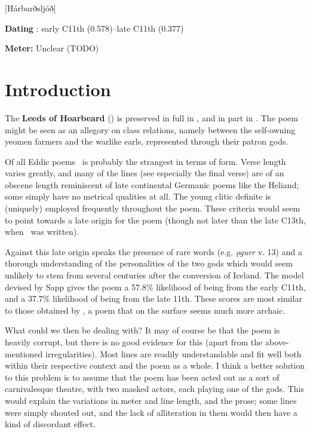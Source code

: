 [Hárbarðsljóð]
\def\thisBookCode{Harbardsljod}

\begin{flushright}%
\textbf{Dating} \parencite{Sapp2022}: early C11th (0.578)–late C11th (0.377)

\textbf{Meter:} Unclear (TODO)%
\end{flushright}

\section{Introduction}

The \textbf{Leeds of Hoarbeard} (\Harbardsljod) is preserved in full in \Regius, and in part in \AM.  The poem might be seen as an allegory on class relations, namely between the self-owning yeomen farmers and the warlike earls, represented through their patron gods.

Of all Eddic poems \Harbardsljod\ is probably the strangest in terms of form. Verse length varies greatly, and many of the lines (see especially the final verse) are of an obscene length reminiscent of late continental Germanic poems like the Heliand; some simply have no metrical qualities at all. The young clitic definite is (uniquely) employed frequently throughout the poem. These criteria would seem to point towards a late origin for the poem (though not later than the late C13th, when \Regius\ was written).

Against this late origin speaks the presence of rare words (e.g. \emph{ǫgurr} v. 13) and a thorough understanding of the personalities of the two gods which would seem unlikely to stem from several centuries after the conversion of Iceland. The model devised by Sapp gives the poem a 57.8\% likelihood of being from the early C11th, and a 37.7\% likelihood of being from the late 11th. These scores are most similar to those obtained by \Gripisspa, a poem that on the surface seems much more archaic.

What could we then be dealing with? It may of course be that the poem is heavily corrupt, but there is no good evidence for this (apart from the above-mentioned irregularities). Most lines are readily understandable and fit well both within their respective context and the poem as a whole. I think a better solution to this problem is to assume that the poem has been acted out as a sort of carnivalesque theatre, with two masked actors, each playing one of the gods. This would explain the variations in meter and line length, and the prose; some lines were simply shouted out, and the lack of alliteration in them would then have a kind of discordant effect.

